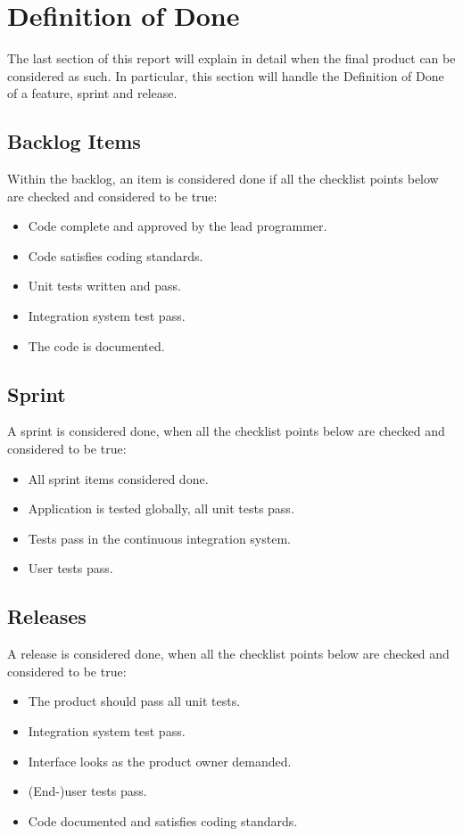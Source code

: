 \documentclass[11pt,twoside,a4paper]{article}
\begin{document}
\newpage

\section{Definition of Done}
The last section of this report will explain in detail when the final product can be considered as such. In particular, this section will handle the Definition of Done of a feature, sprint and release.


\subsection{Backlog Items}
Within the backlog, an item is considered done if all the checklist points below are checked and considered to be true:

\begin{itemize}
	\item Code complete and approved by the lead programmer.
	\item Code satisfies coding standards.
	\item Unit tests written and pass.
	\item Integration system test pass.
	\item The code is documented.
\end{itemize}


\subsection{Sprint}
A sprint is considered done, when all the checklist points below are checked and considered to be true:

\begin{itemize}
	\item All sprint items considered done.
	\item Application is tested globally, all unit tests pass.
	\item Tests pass in the continuous integration system.
	\item User tests pass.
\end{itemize}


\subsection{Releases}
A release is considered done, when all the checklist points below are checked and considered to be true:

\begin{itemize}
	\item The product should pass all unit tests.
	\item Integration system test pass.
	\item Interface looks as the product owner demanded.
	\item (End-)user tests pass.
	\item Code documented and satisfies coding standards.
\end{itemize}
\end{document}
